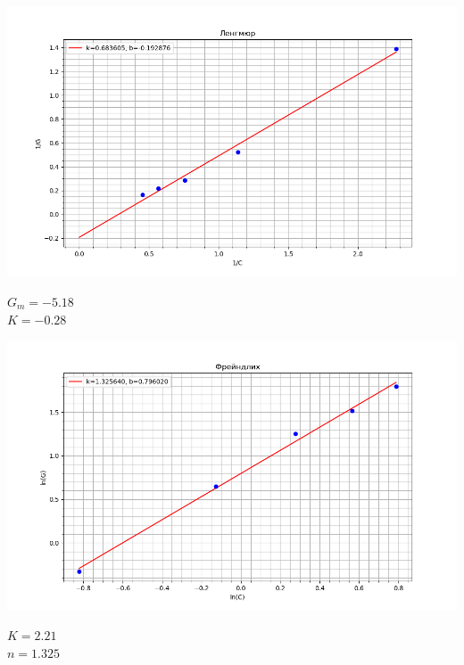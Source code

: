 \documentclass[a4paper]{article}
\begin{document}
\graphicspath{{./}}
		\begin{center}
		
			\includegraphics[scale=0.8]{Ленгмюр.png}
	

	\par
 \vspace{0.3cm}
 \end{center}
\vspace{0.3cm}
\par
\begin{center}
	$G_m=-5.18$\\
	$K=-0.28$
\end{center}

\graphicspath{{./}}
		\begin{center}
		
			\includegraphics[scale=0.8]{Фрейндлих.png}
	

	\par
 \vspace{0.3cm}
 \end{center}
\vspace{0.3cm}
\par
\begin{center}
	$K=2.21$\\
	$n=1.325$\\
\end{center}
\end{document}

